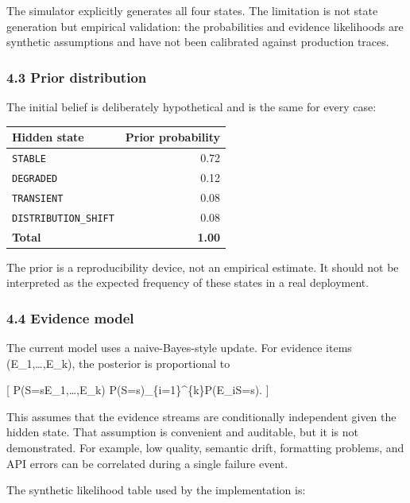 \documentclass[
]{article}
\begin{document}
The simulator explicitly generates all four states. The limitation is
not state generation but empirical validation: the probabilities and
evidence likelihoods are synthetic assumptions and have not been
calibrated against production traces.

\subsubsection{4.3 Prior distribution}\label{prior-distribution}

The initial belief is deliberately hypothetical and is the same for
every case:

\begin{longtable}[]{@{}lr@{}}
\toprule\noalign{}
Hidden state & Prior probability \\
\midrule\noalign{}
\endhead
\bottomrule\noalign{}
\endlastfoot
\texttt{STABLE} & 0.72 \\
\texttt{DEGRADED} & 0.12 \\
\texttt{TRANSIENT} & 0.08 \\
\texttt{DISTRIBUTION\_SHIFT} & 0.08 \\
\textbf{Total} & \textbf{1.00} \\
\end{longtable}

The prior is a reproducibility device, not an empirical estimate. It
should not be interpreted as the expected frequency of these states in a
real deployment.

\subsubsection{4.4 Evidence model}\label{evidence-model}

The current model uses a naive-Bayes-style update. For evidence items
(E\_1,\ldots,E\_k), the posterior is proportional to

{[} P(S=s\mid E\_1,\ldots,E\_k)
\propto P(S=s)\prod\_\{i=1\}\^{}\{k\}P(E\_i\mid S=s). {]}

This assumes that the evidence streams are conditionally independent
given the hidden state. That assumption is convenient and auditable, but
it is not demonstrated. For example, low quality, semantic drift,
formatting problems, and API errors can be correlated during a single
failure event.

The synthetic likelihood table used by the implementation is:
\end{document}

